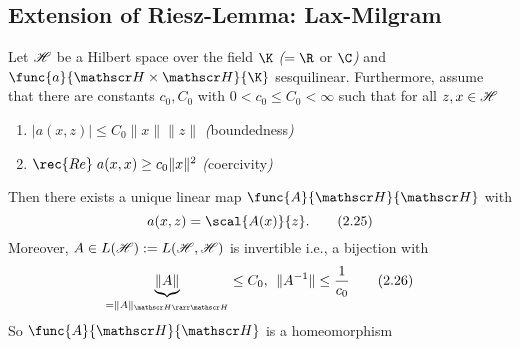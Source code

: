 \subsection{Extension of Riesz-Lemma: Lax-Milgram}
\begin{thm}\label{ii.11}
    Let $\mathscr{H}$ be a Hilbert space over the field $\K$ \emph{(}$=\R$ or $\C$\emph{)} and $\func{a}{\H\times\H}{\K}$ sesquilinear. Furthermore, assume that there are constants $c_0,C_0$ with $0<c_0\leq C_0<\infty$ such that for all $z,x\in\mathscr{H}$
    \begin{enumerate}[label=\arabic*)]
        \item $|a(x,z)|\leq C_0\|x\|\|z\|\label{ii.11.1}$ \emph{(}boundedness\emph{)}
        \item $\rec{Re}\; a(x,x)\geq c_0\|x\|^2\label{ii.11.2}$ \emph{(}coercivity\emph{)}
    \end{enumerate}
    Then there exists a unique linear map $\func{A}{\H}{\H}$ with
    \[a(x,z)=\scal{A(x)}{z}.\label{2.25}\tag{2.25}\]
    Moreover, $A\in L(\mathscr{H}):=L(\mathscr{H},\mathscr{H})$ is invertible \rec{(}i.e., a bijection\rec{)} with
    \[\underbrace{\|A\|}_{=\|A\|_{\H\rarr\H}}\leq C_0,\;\,\|A^{-1}\|\leq\frac{1}{c_0}\tag{2.26}\label{2.26}\]
    \rec{(}So $\func{A}{\H}{\H}$ is a homeomorphism\rec{)}
\end{thm}

